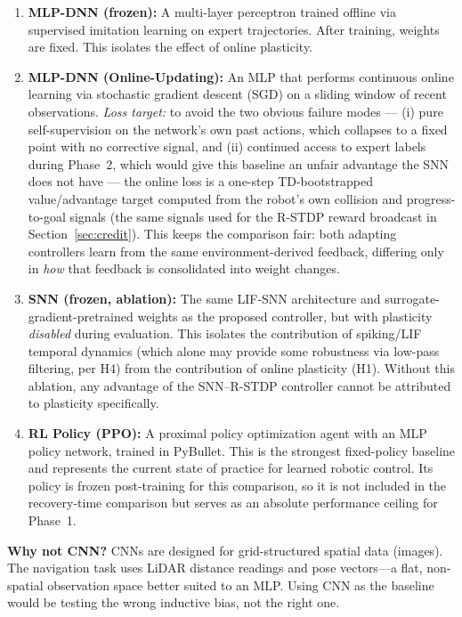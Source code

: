 \documentclass[11pt,a4paper]{article}
\begin{document}
\begin{enumerate}[leftmargin=*, itemsep=3pt]
  \item \textbf{MLP-DNN (frozen):} A multi-layer perceptron trained offline via
        supervised imitation learning on expert trajectories. After training, weights
        are fixed. This isolates the effect of online plasticity.
  \item \textbf{MLP-DNN (Online-Updating):} An MLP that performs continuous online
        learning via stochastic gradient descent (SGD) on a sliding window of recent
        observations. \emph{Loss target:} to avoid the two obvious failure modes ---
        (i) pure self-supervision on the network's own past actions, which collapses
        to a fixed point with no corrective signal, and (ii) continued access to
        expert labels during Phase~2, which would give this baseline an unfair
        advantage the SNN does not have --- the online loss is a one-step
        TD-bootstrapped value/advantage target computed from the robot's own
        collision and progress-to-goal signals (the same signals used for the
        R-STDP reward broadcast in Section~\ref{sec:credit}). This keeps the
        comparison fair: both adapting controllers learn from the same
        environment-derived feedback, differing only in \emph{how} that feedback is
        consolidated into weight changes.
  \item \textbf{SNN (frozen, ablation):} The same LIF-SNN architecture and
        surrogate-gradient-pretrained weights as the proposed controller, but with
        plasticity \emph{disabled} during evaluation. This isolates the contribution of
        spiking/LIF temporal dynamics (which alone may provide some robustness via
        low-pass filtering, per H4) from the contribution of online plasticity
        (H1). Without this ablation, any advantage of the SNN--R-STDP controller cannot
        be attributed to plasticity specifically.
  \item \textbf{RL Policy (PPO):} A proximal policy optimization agent with an MLP
        policy network, trained in PyBullet. This is the strongest fixed-policy
        baseline and represents the current state of practice for learned robotic
        control. Its policy is frozen post-training for this comparison, so it is not
        included in the recovery-time comparison but serves as an absolute
        performance ceiling for Phase~1.
\end{enumerate}

\begin{notebox}
  \textbf{Why not CNN?} CNNs are designed for grid-structured spatial data (images).
  The navigation task uses LiDAR distance readings and pose vectors---a flat,
  non-spatial observation space better suited to an MLP. Using CNN as the baseline
  would be testing the wrong inductive bias, not the right one.
\end{notebox}
\end{document}
